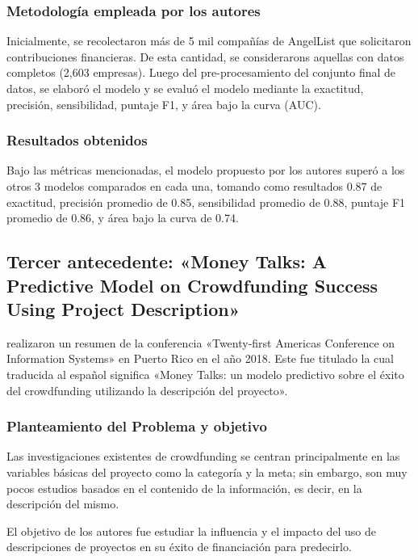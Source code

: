 \subsubsection{Metodología empleada por los autores}
Inicialmente, se recolectaron más de 5 mil compañías de AngelList que solicitaron contribuciones financieras. De esta cantidad, se considerarons aquellas con datos completos (2,603 empresas). Luego del pre-procesamiento del conjunto final de datos, se elaboró el modelo y se evaluó el modelo mediante la exactitud, precisión, sensibilidad, puntaje F1, y área bajo la curva (AUC).

\subsubsection{Resultados obtenidos}
Bajo las métricas mencionadas, el modelo propuesto por los autores superó a los otros 3 modelos comparados en cada una, tomando como resultados 0.87 de exactitud, precisión promedio de 0.85, sensibilidad promedio de 0.88, puntaje F1 promedio de 0.86, y área bajo la curva de 0.74.


\subsection{Tercer antecedente: «Money Talks: A Predictive Model on Crowdfunding Success Using Project Description» \citep*{pr_zhou2015projectdesc}}
\citeauthor{pr_zhou2015projectdesc} realizaron un resumen de la conferencia «Twenty-first Americas Conference on Information Systems» en Puerto Rico en el año 2018. Este fue titulado  la cual traducida al español significa «Money Talks: un modelo predictivo sobre el éxito del crowdfunding utilizando la descripción del proyecto».

\subsubsection{Planteamiento del Problema y objetivo}
Las investigaciones existentes de crowdfunding se centran principalmente en las variables básicas del proyecto como la categoría y la meta; sin embargo, son muy pocos estudios basados en el contenido de la información, es decir, en la descripción del mismo.

El objetivo de los autores fue estudiar la influencia y el impacto del uso de descripciones de proyectos en su éxito de financiación para predecirlo.

